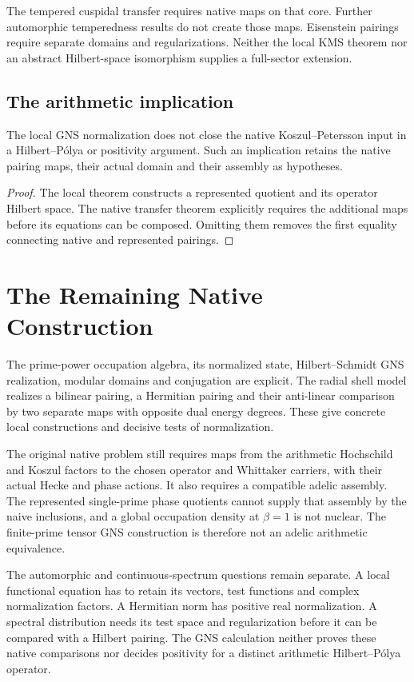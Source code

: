 \begin{remark}
\label{v4-arith:kms-gns:rem:P3-domain-enlargement}
The tempered cuspidal transfer requires native maps on that
core. Further automorphic temperedness results do not create
those maps. Eisenstein pairings require separate domains and
regularizations. Neither the local KMS theorem nor an abstract
Hilbert-space isomorphism supplies a full-sector extension.
\end{remark}

\subsection{The arithmetic implication}
\label{v4-arith:kms-gns:P3:rh}
\begin{corollary}
\label{v4-arith:kms-gns:cor:rh-minimal-updated}
The local GNS normalization does not close the native
Koszul--Petersson input in a Hilbert--P\'olya or positivity
argument. Such an implication retains the native pairing maps,
their actual domain and their assembly as hypotheses.
\end{corollary}
\begin{proof}
The local theorem constructs a represented quotient and its
operator Hilbert space. The native transfer theorem explicitly
requires the additional maps before its equations can be
composed. Omitting them removes the first equality connecting
native and represented pairings.
\end{proof}

\section{The Remaining Native Construction}
\label{v4-arith:kms-gns:residual-list}
\label{v4-arith:kms-gns:verification}
\label{v4-arith:kms-gns:summary}

The prime-power occupation algebra, its normalized state,
Hilbert--Schmidt GNS realization, modular domains and conjugation
are explicit. The radial shell model realizes a bilinear pairing,
a Hermitian pairing and their anti-linear comparison by two
separate maps with opposite dual energy degrees. These give
concrete local constructions and decisive tests of normalization.

The original native problem still requires maps from the
arithmetic Hochschild and Koszul factors to the chosen operator
and Whittaker carriers, with their actual Hecke and phase actions.
It also requires a compatible adelic assembly. The represented
single-prime phase quotients cannot supply that assembly by the
naive inclusions, and a global occupation density at $\beta=1$
is not nuclear. The finite-prime tensor GNS construction is
therefore not an adelic arithmetic equivalence.

The automorphic and continuous-spectrum questions remain
separate. A local functional equation has to retain its vectors,
test functions and complex normalization factors. A Hermitian
norm has positive real normalization. A spectral distribution
needs its test space and regularization before it can be compared
with a Hilbert pairing. The GNS calculation neither proves these
native comparisons nor decides positivity for a distinct
arithmetic Hilbert--P\'olya operator.
